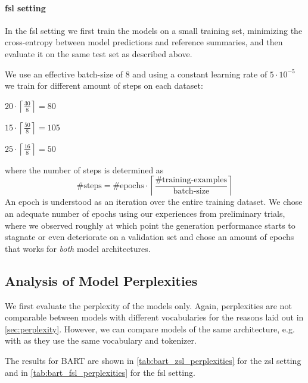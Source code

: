 \paragraph{\acf*{fsl} setting}

In the \ac{fsl} setting we first train the models on a small training set,
minimizing the cross-entropy between model predictions and reference summaries,
and then evaluate it on the same test set as described above.

We use an effective batch-size of 8 and using a constant learning rate of \(5 \cdot 10^{-5}\) we train for different amount of steps on each dataset:
\begin{description}[nosep, itemsep=1ex, labelwidth=\widthof{\logsummary}, leftmargin=\labelwidth+\labelsep, align=parright]
\item[\logsummary] \(20 \cdot \left\lceil\frac{30}{8}\right\rceil = 80\)
\item[\hadoop]     \(15 \cdot \left\lceil\frac{50}{8}\right\rceil = 105\)
\item[\telco]      \(25 \cdot \left\lceil\frac{16}{8}\right\rceil = 50\)
\end{description}
where the number of steps is determined as
\begin{equation}
\text{\#steps} = \text{\#epochs} \cdot \left\lceil\frac{\text{\#training-examples}}{\text{batch-size}}\right\rceil
\end{equation}
An epoch is understood as an iteration over the entire training dataset.
We chose an adequate number of epochs using our experiences from preliminary trials,
where we observed roughly at which point the generation
performance starts to stagnate or even deteriorate on a validation set
and chose an amount of epochs that works for \emph{both} model architectures.

\subsection{Analysis of Model Perplexities}

We first evaluate the perplexity of the models only.
Again, perplexities are not comparable between models with different vocabularies
for the reasons laid out in \autoref{sec:perplexity}.
However, we can compare models of the same architecture,
e.g.  with  as they use the same vocabulary and tokenizer.

The results for BART are shown in \autoref{tab:bart_zsl_perplexities} for the \acl{zsl} setting
and in \autoref{tab:bart_fsl_perplexities} for the \acl{fsl} setting.

